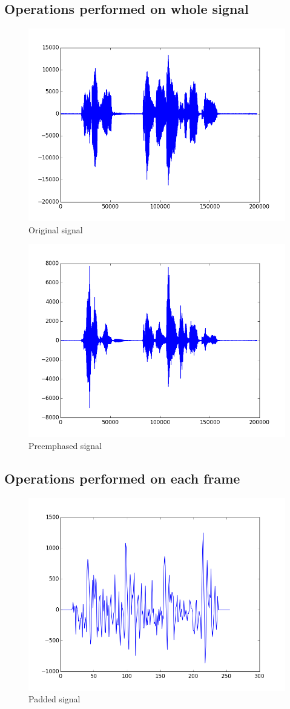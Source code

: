 \documentclass[magister]{dyplom}
\begin{document}
	\subsection{Operations performed on whole signal}
	
	\begin{figure}[!th]
		\centering
		\includegraphics[width=0.5\linewidth]{images/simulation/PAR_001_original_signal}
		\caption{Original signal}
		\label{fig:PAR_001_original_signal}
	\end{figure}
	
	\begin{figure}[!th]
		\centering
		\includegraphics[width=0.5\linewidth]{images/simulation/PAR_002_preemphased_signal}
		\caption{Preemphased signal}
		\label{fig:PAR_002_preemphased_signal}
	\end{figure}

	\FloatBarrier
	\clearpage
	\subsection{Operations performed on each frame}

	\begin{figure}[!th]
		\centering
		\includegraphics[width=0.5\linewidth]{images/simulation/PAR_003_padded_signal}
		\caption{Padded signal}
		\label{fig:PAR_003_padded_signal}
	\end{figure}
\end{document}
